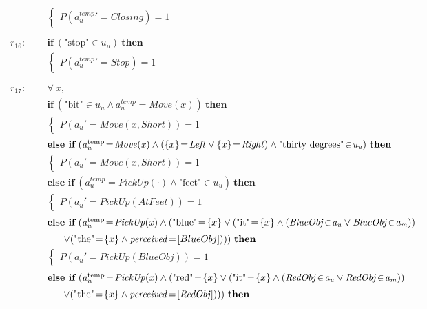 \begin{footnotesize}
\begin{longtable}{p{1cm}l}
 & \;\;\;\;\; $ \begin{cases}P(\mathit{a_u^{\text{temp}}}'\!=\!\mathit{Closing})\!=\!1 \end{cases}$ \\ \\[-1mm]
$r_{16}$: \ \ & $ \textbf{if} \ (\text{"stop"}\!\in\!\mathit{u_u}) \ \textbf{then} $ \\
 & \;\;\;\;\; $ \begin{cases}P(\mathit{a_u^{\text{temp}}}'\!=\!\mathit{Stop})\!=\!1 \end{cases}$ \\ \\[-1mm]
$r_{17}$: \ \ & $\forall \ x, $ \\ & $ \textbf{if} \ (\text{"bit"}\!\in\!\mathit{u_u} \land \mathit{a_u^{\text{temp}}}\!=\!\mathit{Move({x})}) \ \textbf{then} $ \\
 & \;\;\;\;\; $ \begin{cases}P(\mathit{a_u}'\!=\!\mathit{Move({x},Short)})\!=\!1 \end{cases}$ \vspace{1mm} \\ & $ \textbf{else if} \ (\mathit{a_u^{\text{temp}}}\!=\!\mathit{Move({x})} \land (\mathit\{x\}\!=\!\mathit{Left} \lor \mathit\{x\}\!=\!\mathit{Right}) \land \text{"thirty degrees"}\!\in\!\mathit{u_u}) \ \textbf{then}$ \\
& \;\;\;\;\; $ \begin{cases}P(\mathit{a_u}'\!=\!\mathit{Move({x},Short)})\!=\!1 \end{cases}$ \vspace{1mm} \\ & $ \textbf{else if} \ (\mathit{a_u^{\text{temp}}}\!=\!\mathit{PickUp(\cdot)} \land \text{"feet"}\!\in\!\mathit{u_u}) \ \textbf{then}$ \\
& \;\;\;\;\; $ \begin{cases}P(\mathit{a_u}'\!=\!\mathit{PickUp(AtFeet)})\!=\!1 \end{cases}$  \vspace{1mm} \\ & $ \textbf{else if} \ (\mathit{a_u^{\text{temp}}}\!=\!\mathit{PickUp({x})} \land (\text{"blue"}\!=\!\mathit\{x\} \lor (\text{"it"}\!=\!\mathit\{x\} \land (\mathit{BlueObj}\!\in\!\mathit{a_u} \lor \mathit{BlueObj}\!\in\!\mathit{a_m})) $ \\ & $\ \ \ \ \ \lor (\text{"the"}\!=\!\mathit\{x\} \land \mathit{perceived}\!=\![BlueObj] ))) \ \textbf{then}$ \\
& \;\;\;\;\; $ \begin{cases}P(\mathit{a_u}'\!=\!\mathit{PickUp(BlueObj)})\!=\!1 \end{cases}$ \vspace{1mm} \\ & $ \textbf{else if} \ (\mathit{a_u^{\text{temp}}}\!=\!\mathit{PickUp({x})} \land (\text{"red"}\!=\!\mathit\{x\} \lor (\text{"it"}\!=\!\mathit\{x\} \land (\mathit{RedObj}\!\in\!\mathit{a_u} \lor \mathit{RedObj}\!\in\!\mathit{a_m})) $ \\ & $\ \ \ \ \  \lor (\text{"the"}\!=\!\mathit\{x\} \land \mathit{perceived}\!=\![\mathit{RedObj}]))) \ \textbf{then}$ \\

\end{longtable}
\end{footnotesize}
